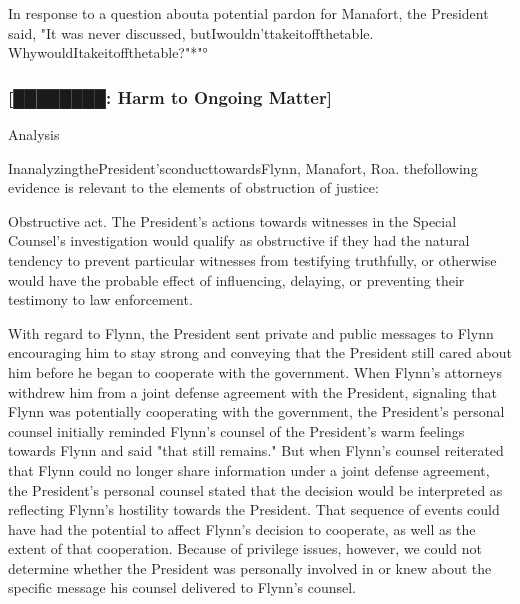 In response to a question abouta potential pardon for Manafort, the President said, "It was never discussed, butIwouldn'ttakeitoffthetable.
WhywouldItakeitoffthetable?"*"°

\subsubsection{[████████: Harm to Ongoing Matter]}








Analysis

InanalyzingthePresident'sconducttowardsFlynn, Manafort, Roa.
thefollowing evidence is relevant to the elements of obstruction of justice:

Obstructive act.
The President's actions towards witnesses in the Special Counsel's investigation would qualify as obstructive if they had the natural tendency to prevent particular witnesses from testifying truthfully, or otherwise would have the probable effect of influencing, delaying, or preventing their testimony to law enforcement.

With regard to Flynn, the President sent private and public messages to Flynn encouraging him to stay strong and conveying that the President still cared about him before he began to cooperate with the government.
When Flynn's attorneys withdrew him from a joint defense agreement with the President, signaling that Flynn was potentially cooperating with the government, the President's personal counsel initially reminded Flynn's counsel of the President's warm feelings towards Flynn and said "that still remains."
But when Flynn's counsel reiterated that Flynn could no longer share information under a joint defense agreement, the President's personal counsel stated that the decision would be interpreted as reflecting Flynn's hostility towards the President.
That sequence of events could have had the potential to affect Flynn's decision to cooperate, as well as the extent of that cooperation.
Because of privilege issues, however, we could not determine whether the President was personally involved in or knew about the specific message his counsel delivered to Flynn's counsel.

